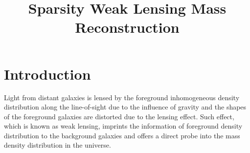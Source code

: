 \documentclass[twocolumn]{aastex62}
\begin{document}
\title{Sparsity Weak Lensing Mass Reconstruction}




\begin{abstract}

\end{abstract}

\section{Introduction}
Light from distant galaxies is lensed by the foreground inhomogeneous density distribution along the line-of-sight 
due to the influence of gravity and the shapes of the foreground galaxies are distorted due to the lensing effect. 
Such effect, which is known as weak lensing, imprints the information of foreground density distribution to the 
background galaxies and offers a direct probe into the mass density distribution in the universe. 
\end{document}
